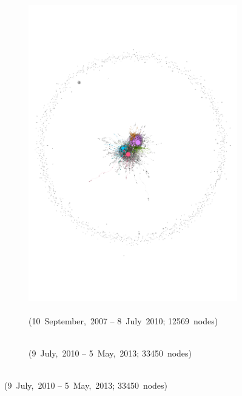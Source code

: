 \documentclass[
  a4paper,
  abstract=on,
  captions=tableabove
  ]{scrartcl}
\begin{document}
      \begin{figure}
        \centering
        \begin{subfigure}{.45\linewidth}
          \caption{\\ (10~September,~2007 -- 8~July~2010; \num{12569}~nodes)}
          \label{subfig:net_diac_hyperlocal_one}
          \centering
          \includegraphics[width=\linewidth, height=\textheight, keepaspectratio]{img/net_hyperlocal_one.pdf}
        \end{subfigure}
        \begin{subfigure}{.45\linewidth}
          \caption{\\ (9~July,~2010 -- 5~May,~2013; \num{33450}~nodes)}
          \label{subfig:net_diac_hyperlocal_two}
          \centering

\end{subfigure}
\end{figure}
\end{document}
